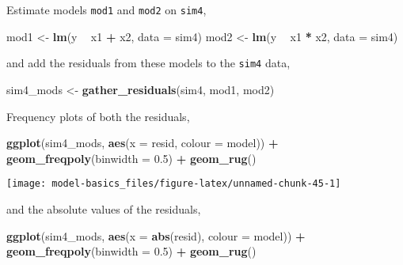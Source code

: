 \documentclass[]{book}
\newenvironment{Shaded}{\begin{snugshade}}{\end{snugshade}}
\newcommand{\DataTypeTok}[1]{\textcolor[rgb]{0.13,0.29,0.53}{#1}}
\newcommand{\FloatTok}[1]{\textcolor[rgb]{0.00,0.00,0.81}{#1}}
\newcommand{\KeywordTok}[1]{\textcolor[rgb]{0.13,0.29,0.53}{\textbf{#1}}}
\newcommand{\NormalTok}[1]{#1}
\newcommand{\OperatorTok}[1]{\textcolor[rgb]{0.81,0.36,0.00}{\textbf{#1}}}
\newcommand{\StringTok}[1]{\textcolor[rgb]{0.31,0.60,0.02}{#1}}
\theoremstyle{plain}
\theoremstyle{remark}
\theoremstyle{definition}
\theoremstyle{definition}
\theoremstyle{definition}
\theoremstyle{remark}
\begin{document}
Estimate models \texttt{mod1} and \texttt{mod2} on \texttt{sim4},

\begin{Shaded}
\begin{Highlighting}[]
\NormalTok{mod1 <-}\StringTok{ }\KeywordTok{lm}\NormalTok{(y }\OperatorTok{~}\StringTok{ }\NormalTok{x1 }\OperatorTok{+}\StringTok{ }\NormalTok{x2, }\DataTypeTok{data =}\NormalTok{ sim4)}
\NormalTok{mod2 <-}\StringTok{ }\KeywordTok{lm}\NormalTok{(y }\OperatorTok{~}\StringTok{ }\NormalTok{x1 }\OperatorTok{*}\StringTok{ }\NormalTok{x2, }\DataTypeTok{data =}\NormalTok{ sim4)}
\end{Highlighting}
\end{Shaded}

and add the residuals from these models to the \texttt{sim4} data,

\begin{Shaded}
\begin{Highlighting}[]
\NormalTok{sim4_mods <-}\StringTok{ }\KeywordTok{gather_residuals}\NormalTok{(sim4, mod1, mod2)}
\end{Highlighting}
\end{Shaded}

Frequency plots of both the residuals,

\begin{Shaded}
\begin{Highlighting}[]

\KeywordTok{ggplot}\NormalTok{(sim4_mods, }\KeywordTok{aes}\NormalTok{(}\DataTypeTok{x =}\NormalTok{ resid, }\DataTypeTok{colour =}\NormalTok{ model)) }\OperatorTok{+}
\StringTok{  }\KeywordTok{geom_freqpoly}\NormalTok{(}\DataTypeTok{binwidth =} \FloatTok{0.5}\NormalTok{) }\OperatorTok{+}
\StringTok{  }\KeywordTok{geom_rug}\NormalTok{()}
\end{Highlighting}
\end{Shaded}

\begin{center}\texttt{[image: model-basics\_files/figure-latex/unnamed-chunk-45-1]} \end{center}

and the absolute values of the residuals,

\begin{Shaded}
\begin{Highlighting}[]
\KeywordTok{ggplot}\NormalTok{(sim4_mods, }\KeywordTok{aes}\NormalTok{(}\DataTypeTok{x =} \KeywordTok{abs}\NormalTok{(resid), }\DataTypeTok{colour =}\NormalTok{ model)) }\OperatorTok{+}
\StringTok{  }\KeywordTok{geom_freqpoly}\NormalTok{(}\DataTypeTok{binwidth =} \FloatTok{0.5}\NormalTok{) }\OperatorTok{+}
\StringTok{  }\KeywordTok{geom_rug}\NormalTok{()}
\end{Highlighting}
\end{Shaded}
\end{document}
